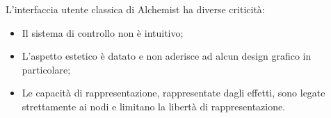 \documentclass[%
]{beamer}
\begin{document}
            \begin{frame}
                \frametitle{\insertsection}
                \framesubtitle{\insertsubsection}
                \centering
            \end{frame}

            \begin{frame}
                \frametitle{\insertsection}
                \framesubtitle{\insertsubsection}
                L'interfaccia utente classica di Alchemist ha diverse criticità:

                \begin{itemize}[<+(1)->]
                  \item
                      Il sistema di controllo non è intuitivo;
                  \item
                      L'aspetto estetico è datato e non aderisce ad alcun design grafico in particolare;
                  \item
                      Le capacità di rappresentazione, rappresentate dagli effetti, sono legate strettamente ai nodi e limitano la libertà di rappresentazione.
                \end{itemize}
            \end{frame}
\end{document}
